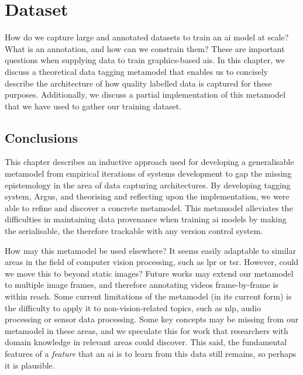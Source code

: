 \chapter{Dataset}
\label{ch:dataset}

How do we capture large and annotated datasets to train an \gls{ai} model at scale? What is an annotation, and how can we constrain them? These are important questions when supplying data to train graphics-based \glspl{ai}. In this chapter, we discuss a theoretical data tagging metamodel that enables us to concisely describe the architecture of how quality labelled data is captured for these purposes. Additionally, we discuss a partial implementation of this metamodel that we have used to gather our training dataset.







\section{Conclusions}

This chapter describes an inductive approach used for developing a generalisable metamodel from empirical iterations of systems development to gap the missing epistemology in the area of data capturing architectures. By developing tagging system, Argus, and theorising and reflecting upon the implementation, we were able to refine and discover a concrete metamodel. This metamodel alleviates the difficulties in maintaining data provenance when training \gls{ai} models by making the serialisable, the therefore trackable with any version control system.

How may this metamodel be used elsewhere? It seems easily adaptable to similar areas in the field of computer vision processing, such as \gls{lpr} or \gls{tsr}. However, could we move this to beyond static images? Future works may extend our metamodel to multiple image frames, and therefore annotating videos frame-by-frame is within reach. Some current limitations of the metamodel (in its current form) is the difficulty to apply it to non-vision-related topics, such as \gls{nlp}, audio processing or sensor data processing. Some key concepts may be missing from our metamodel in these areas, and we speculate this for work that researchers with domain knowledge in relevant areas could discover. This said, the fundamental features of a \textit{feature} that an \gls{ai} is to learn from this data still remains, so perhaps it is plausible.

